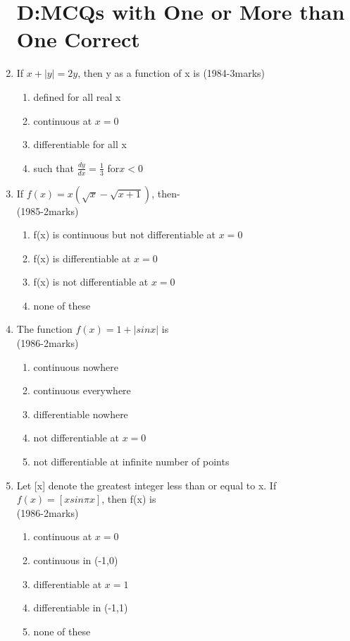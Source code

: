 \documentclass[journal,12pt,twocolumn]{IEEEtran}
\theoremstyle{remark}
\begin{document}
\begin{enumerate}
\section{D:MCQs with One or More than One Correct}
\item If $x+|y|=2y$, then y as a function of x is
\hfill{(1984-3marks)} 
\begin{enumerate}[label=\alph*)]
    \item defined for all real x
    \item continuous at $x=0$
    \item differentiable for all x
    \item such that $\frac{dy}{dx}=\frac{1}{3}$ for$x<0$ \\
\end{enumerate}
\item If $f(x)=x(\sqrt{x}-\sqrt{x+1})$, then- \\
\hfill{(1985-2marks)} 
\begin{enumerate}[label=\alph*)]
    \item f(x) is continuous but not differentiable at $x=0$
    \item f(x) is differentiable at $x=0$
    \item f(x) is not differentiable at $x=0$
    \item none of these \\
\end{enumerate}
\item The function $f(x)=1+|sinx|$ is \\
\hfill{(1986-2marks)} 
\begin{enumerate}[label=\alph*)]
    \item continuous nowhere
    \item continuous everywhere
    \item differentiable nowhere 
    \item not differentiable at $x=0$
    \item not differentiable at infinite number of points \\
\end{enumerate} 
\item Let [x] denote the greatest integer less than or equal to x. If $f(x)=[xsin \pi x]$, then f(x) is \\
\hfill{(1986-2marks)} 
\begin{enumerate}[label=\alph*)]
    \item continuous at $x=0$
    \item continuous in (-1,0)
    \item differentiable at $x=1$ 
    \item differentiable in (-1,1) 
    \item none of these \\
\end{enumerate}


\end{enumerate}
\end{document}
